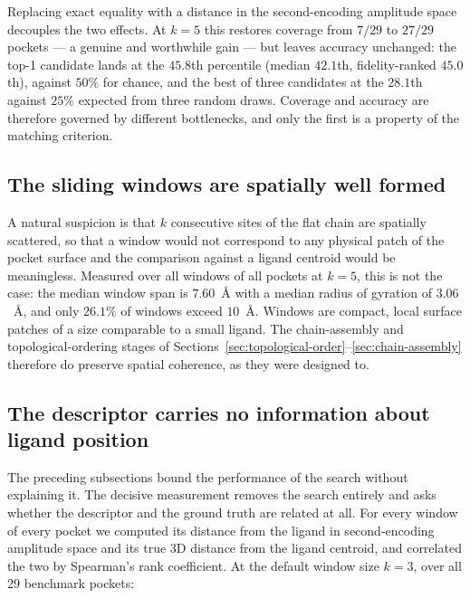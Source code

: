 Replacing exact equality with a distance in the second-encoding amplitude space
decouples the two effects. At $k=5$ this restores coverage from $7/29$ to $27/29$
pockets --- a genuine and worthwhile gain --- but leaves accuracy unchanged: the top-1
candidate lands at the $45.8$th percentile (median $42.1$th, fidelity-ranked $45.0$th),
against $50\%$ for chance, and the best of three candidates at the $28.1$th against
$25\%$ expected from three random draws. Coverage and accuracy are therefore governed by
different bottlenecks, and only the first is a property of the matching criterion.

\subsection{The sliding windows are spatially well formed}
\label{sec:res-geometry}

A natural suspicion is that $k$ consecutive sites of the flat chain are spatially
scattered, so that a window would not correspond to any physical patch of the pocket
surface and the comparison against a ligand centroid would be meaningless. Measured over
all windows of all pockets at $k=5$, this is not the case: the median window span is
$7.60$~\AA{} with a median radius of gyration of $3.06$~\AA{}, and only $26.1\%$ of
windows exceed $10$~\AA{}. Windows are compact, local surface patches of a size
comparable to a small ligand. The chain-assembly and topological-ordering stages of
Sections~\ref{sec:topological-order}--\ref{sec:chain-assembly} therefore do preserve spatial coherence,
as they were designed to.

\subsection{The descriptor carries no information about ligand position}
\label{sec:res-spearman}

The preceding subsections bound the performance of the search without explaining it. The
decisive measurement removes the search entirely and asks whether the descriptor and the
ground truth are related at all. For every window of every pocket we computed its
distance from the ligand in second-encoding amplitude space and its true 3D distance
from the ligand centroid, and correlated the two by Spearman's rank coefficient. At the
default window size $k=3$, over all 29 benchmark pockets:

